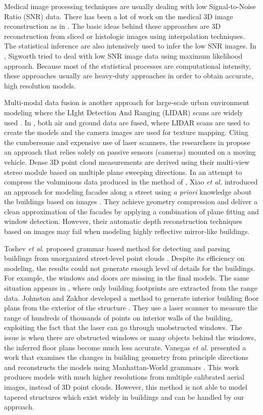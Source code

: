 Medical image processing techniques are usually dealing
with low Signal-to-Noise Ratio (SNR) data.
There has been a lot of work on the medical 3D image reconstruction as in
\cite{MIR_BMMNB, MIR_KL, MIR_SKJ, MIR_SMHC, MIR_BVC}.
The basic ideas behind these approaches
are 3D reconstruction from sliced or histologic images using interpolation techniques.
The statistical inference are also intensively used to infer the low SNR images.
In \cite{MIR_FJS}, Sigworth tried to deal with low SNR image data
using maximum likelihood approach.
Because most of the statistical processes are computational intensity,
these approaches usually are heavy-duty approaches
in order to obtain accurate, high resolution models.

Multi-modal data fusion is another approach for large-scale urban environment modeling
where the LIght Detection And Ranging (LIDAR) scans are widely used \cite{UM_HYN}.
In \cite{UM_Zakhor}, both air and ground data are fused,
where LIDAR scans are used to create the models
and the camera images are used for texture mapping.
Citing the cumbersome and expensive use of laser scanners, the researchers
in \cite{AKBARZADEH06} propose an approach that relies solely on passive
sensors (cameras) mounted on a moving vehicle.
Dense 3D point cloud measurements are derived using their multi-view stereo
module based on multiple plane sweeping directions.
In an attempt to compress the voluminous data produced in the method of
\cite{AKBARZADEH06},
Xiao {\it et al.} introduced an approach for modeling facades along a street
using {\it a priori} knowledge about the buildings based on images \cite{UM_XFTQ}.
They achieve geometry compression and deliver a clean approximation of the
facades by applying a combination of plane fitting and window detection.
However, their automatic depth reconstruction techniques based on images may fail
when modeling highly reflective mirror-like buildings.

Toshev {\it et al.} proposed grammar based method for detecting and parsing
buildings from unorganized street-level point clouds \cite{RW_TMT} .
Despite its efficiency on modeling, the results could not generate
enough level of details for the buildings.
For example, the windows and doors are missing in the final models.
The same situation appears in \cite{RW_HDP}, where only building footprints
are extracted from the range data.
Johnston and Zakhor developed a method to generate
interior building floor plans from the exterior of the structure \cite{RW_JZ}.
They use a laser scanner to measure the range of
hundreds of thousands of points on interior walls of the building,
exploiting the fact that the laser can go through unobstructed windows.
The issue is when there are obstructed windows or many objects behind the windows,
the inferred floor plans become much less accurate.
Vanegas {\it et al.} presented a work that examines the changes in
building geometry from principle directions and reconstructs the models
using Manhattan-World grammars \cite{RW_VAB}.
This work produces models with much higher resolutions from
multiple calibrated aerial images, instead of 3D point clouds.
However, this method is not able to model tapered structures
which exist widely in buildings and can be handled by our approach.

